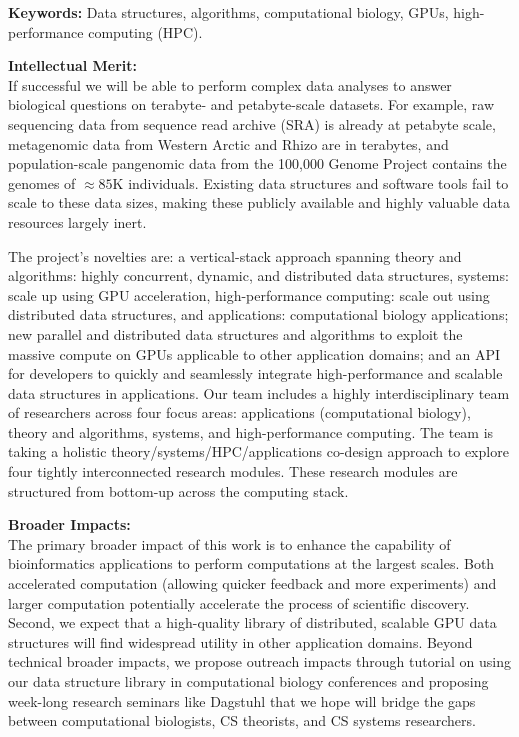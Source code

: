 \noindent \textbf{\large Keywords:} Data structures, algorithms, computational biology, GPUs, high-performance computing (HPC).

\noindent \textbf{\large Intellectual Merit:}\\
If successful we will be able to perform complex data analyses to answer biological questions on terabyte- and petabyte-scale datasets. For example, raw sequencing data from sequence read archive (SRA) is already at petabyte scale, metagenomic data from Western Arctic and Rhizo are in terabytes, and population-scale pangenomic data from the 100,000 Genome Project contains the genomes of $\approx85$K individuals. Existing data structures and software tools fail to scale to these data sizes, making these publicly available and highly valuable data resources largely inert.

The project’s novelties are: a vertical-stack approach spanning theory and algorithms: highly concurrent, dynamic, and distributed data structures, systems: scale up using GPU acceleration, high-performance computing: scale out using distributed data structures, and applications: computational biology applications; new parallel and distributed data structures and algorithms to exploit the massive compute on GPUs applicable to other application domains; and an API for developers to quickly and seamlessly integrate high-performance and scalable data structures in applications.
%
Our team includes a highly interdisciplinary team of researchers across four focus areas: applications (computational biology), theory and algorithms, systems, and high-performance computing. The team is taking a holistic theory/systems/HPC/applications co-design approach to explore four tightly interconnected research modules. These research modules are structured from bottom-up across the computing stack.

\noindent \textbf{\large Broader Impacts: }\\
The primary broader impact of this work is to enhance the capability of bioinformatics applications to perform computations at the largest scales. Both accelerated computation (allowing quicker feedback and more experiments) and larger computation potentially accelerate the process of scientific discovery. Second, we expect that a high-quality library of distributed, scalable GPU data structures will find widespread utility in other application domains.
%
Beyond technical broader impacts, we propose outreach impacts through tutorial on using our data structure library in computational biology conferences and proposing week-long research seminars like Dagstuhl that we hope will bridge the gaps between computational biologists, CS theorists, and CS systems researchers.
